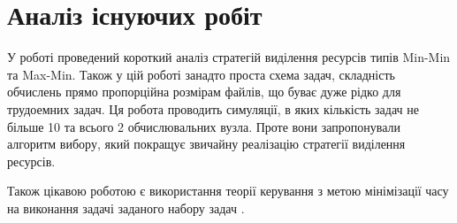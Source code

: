 \section{Аналіз існуючих робіт}

У роботі \cite{AppSelAlgoFEffResProvInCloud} проведений короткий аналіз стратегій виділення ресурсів типів Min-Min та Max-Min. Також у цій роботі занадто проста схема задач, складність обчислень прямо пропорційна розмірам файлів, що буває дуже рідко для трудоемних задач. Ця робота проводить симуляції, в яких кількість задач не більше 10 та всього 2 обчислювальних вузла. Проте вони запропонували алгоритм вибору, який покращує звичайну реалізацію стратегії виділення ресурсів.

Також цікавою роботою є використання теорії керування з метою мінімізації часу на виконання задачі заданого набору задач \cite{Prasanna1991GeneralisedMS}.